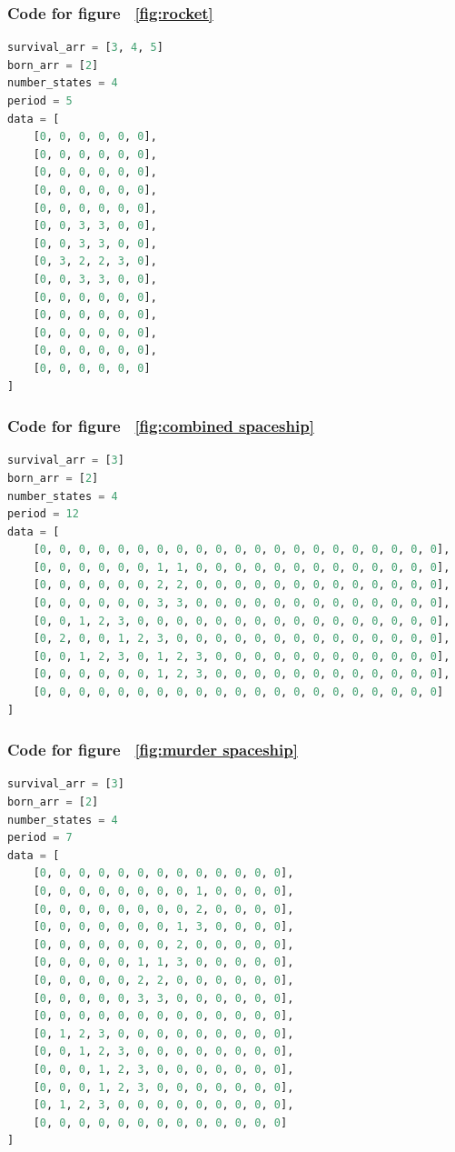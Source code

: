 \documentclass[12pt]{article}
\numberwithin{figure}{section} %
\begin{document}
\subsubsection{Code for figure ~\ref{fig:rocket}}
\label{subsubsection:rocket}
\begin{lstlisting}[language = Python]
survival_arr = [3, 4, 5]
born_arr = [2]
number_states = 4
period = 5
data = [
    [0, 0, 0, 0, 0, 0],
    [0, 0, 0, 0, 0, 0],
    [0, 0, 0, 0, 0, 0],
    [0, 0, 0, 0, 0, 0],
    [0, 0, 0, 0, 0, 0],
    [0, 0, 3, 3, 0, 0],
    [0, 0, 3, 3, 0, 0],
    [0, 3, 2, 2, 3, 0], 
    [0, 0, 3, 3, 0, 0],
    [0, 0, 0, 0, 0, 0],
    [0, 0, 0, 0, 0, 0],
    [0, 0, 0, 0, 0, 0],
    [0, 0, 0, 0, 0, 0],
    [0, 0, 0, 0, 0, 0]
]
\end{lstlisting}

\subsubsection{Code for figure ~\ref{fig:combined spaceship}}
\label{subsubsection:combined spaceship}
\begin{lstlisting}[language = Python]
survival_arr = [3]
born_arr = [2]
number_states = 4
period = 12
data = [
    [0, 0, 0, 0, 0, 0, 0, 0, 0, 0, 0, 0, 0, 0, 0, 0, 0, 0, 0, 0, 0],
    [0, 0, 0, 0, 0, 0, 1, 1, 0, 0, 0, 0, 0, 0, 0, 0, 0, 0, 0, 0, 0],
    [0, 0, 0, 0, 0, 0, 2, 2, 0, 0, 0, 0, 0, 0, 0, 0, 0, 0, 0, 0, 0],
    [0, 0, 0, 0, 0, 0, 3, 3, 0, 0, 0, 0, 0, 0, 0, 0, 0, 0, 0, 0, 0],
    [0, 0, 1, 2, 3, 0, 0, 0, 0, 0, 0, 0, 0, 0, 0, 0, 0, 0, 0, 0, 0],
    [0, 2, 0, 0, 1, 2, 3, 0, 0, 0, 0, 0, 0, 0, 0, 0, 0, 0, 0, 0, 0],
    [0, 0, 1, 2, 3, 0, 1, 2, 3, 0, 0, 0, 0, 0, 0, 0, 0, 0, 0, 0, 0],
    [0, 0, 0, 0, 0, 0, 1, 2, 3, 0, 0, 0, 0, 0, 0, 0, 0, 0, 0, 0, 0],
    [0, 0, 0, 0, 0, 0, 0, 0, 0, 0, 0, 0, 0, 0, 0, 0, 0, 0, 0, 0, 0]
]
\end{lstlisting}

\subsubsection{Code for figure ~\ref{fig:murder spaceship}}
\label{subsubsection:murder spaceship}
\begin{lstlisting}[language = Python]
survival_arr = [3]
born_arr = [2]
number_states = 4
period = 7
data = [
    [0, 0, 0, 0, 0, 0, 0, 0, 0, 0, 0, 0, 0],
    [0, 0, 0, 0, 0, 0, 0, 0, 1, 0, 0, 0, 0],
    [0, 0, 0, 0, 0, 0, 0, 0, 2, 0, 0, 0, 0],
    [0, 0, 0, 0, 0, 0, 0, 1, 3, 0, 0, 0, 0],
    [0, 0, 0, 0, 0, 0, 0, 2, 0, 0, 0, 0, 0],
    [0, 0, 0, 0, 0, 1, 1, 3, 0, 0, 0, 0, 0],
    [0, 0, 0, 0, 0, 2, 2, 0, 0, 0, 0, 0, 0],
    [0, 0, 0, 0, 0, 3, 3, 0, 0, 0, 0, 0, 0],
    [0, 0, 0, 0, 0, 0, 0, 0, 0, 0, 0, 0, 0],
    [0, 1, 2, 3, 0, 0, 0, 0, 0, 0, 0, 0, 0],
    [0, 0, 1, 2, 3, 0, 0, 0, 0, 0, 0, 0, 0],
    [0, 0, 0, 1, 2, 3, 0, 0, 0, 0, 0, 0, 0],
    [0, 0, 0, 1, 2, 3, 0, 0, 0, 0, 0, 0, 0],
    [0, 1, 2, 3, 0, 0, 0, 0, 0, 0, 0, 0, 0],
    [0, 0, 0, 0, 0, 0, 0, 0, 0, 0, 0, 0, 0]
]

\end{lstlisting}
\end{document}

